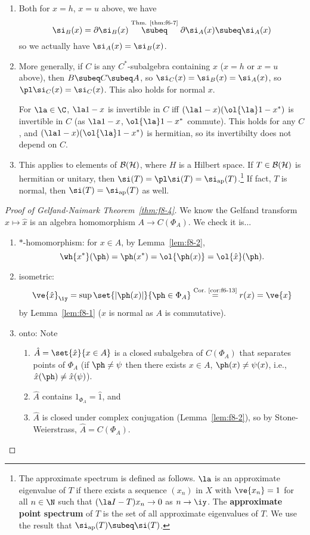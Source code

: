 \begin{rem}
\begin{enumerate}
\item
Both for $x=h$, $x=u$ above, we have 
\[
\si_B(x)=\partial \si_B(x)\stackrel{\text{Thm. \ref{thm:f6-7}}}{\subeq} \partial \si_A(x)\subeq \si_A(x)
\]
so we actually have $\si_A(x)=\si_B(x)$.
\item
More generally, if $C$ is any $C^*$-subalgebra containing $x$ ($x=h$ or $x=u$ above), then $B\subeq C\subeq A$, so $\si_C(x)=\si_B(x)=\si_A(x)$, so $\pl \si_C(x)=\si_C(x)$. This also holds for normal $x$.

For $\la\in \C$, $\la1-x$ is invertible in $C$ iff $(\la1-x)(\ol{\la}1-x^*)$ is invertible in $C$ (as $\la1-x$, $\ol{\la}1-x^*$ commute). %
This holds for any $C$, and $(\la1-x)(\ol{\la}1-x^*)$ is hermitian, so its invertibilty does not depend on $C$.
\item
This applies to elements of $\cal B(H)$, where $H$ is a Hilbert space. If $T\in \cal B(H)$ is hermitian or unitary, then $\si(T)=\pl \si(T)=\si_{\text{ap}}(T)$.\footnote{The approximate spectrum is defined as follows. $\la$ is an approximate eigenvalue of $T$ if there exists a sequence $(x_n)$ in $X$ with $\ve{x_n}=1$ for all $n\in \N$ such that $(\la I-T)x_n\to 0$ as $n\to \iy$. The \textbf{approximate point spectrum} of $T$ is the set of all approximate eigenvalues of $T$. We use the result that $\si_{\text{ap}}(T)\subeq \si(T)$.}
If fact, $T$ is normal, then $\si(T)=\si_{\text{ap}}(T)$ as well.
\end{enumerate}
\end{rem}
\begin{proof}[Proof of Gelfand-Naimark Theorem~\ref{thm:f8-4}]
We know the Gelfand transform $x\mapsto \hat x$ is an algebra homomorphism $A\to C(\Phi_A)$. We check it is...
\begin{enumerate}
\item
$*$-homomorphism: for $x\in A$, by Lemma~\ref{lem:f8-2},
\[
\wh{x^*}(\ph)=\ph(x^*)=\ol{\ph(x)}=\ol{\hat{x}}(\ph).
\]
\item
isometric: 
\[
\ve{\hat{x}}_{\iy}=\sup\set{|\ph(x)|}{\ph\in \Phi_A}\stackrel{\text{Cor.~\ref{cor:f6-13}}}={r(x)}=\ve{x}
\]
by Lemma~\ref{lem:f8-1} ($x$ is normal as $A$ is commutative).
\item
onto:
Note 
\begin{enumerate}
\item
$\hat{A}=\set{\hat x}{x\in A}$ is a closed subalgebra of $C(\Phi_A)$ that separates points of $\Phi_A$ (if $\ph\ne \psi$ then there exists $x\in A$, $\ph(x)\ne \psi(x)$, i.e., $\hat x(\ph)\ne \hat x(\psi)$). 
\item
$\hat A$ contains $1_{\Phi_A}=\hat 1$, and
\item
$\hat A$ is closed under complex conjugation (Lemma~\ref{lem:f8-2}), so by Stone-Weierstrass, $\hat A=C(\Phi_A)$.
\end{enumerate}
\end{enumerate}
\end{proof}
